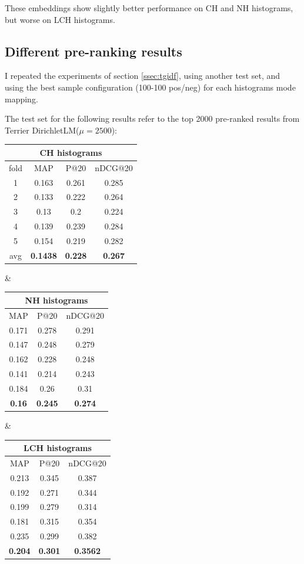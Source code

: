 These embeddings show slightly better performance on CH and NH histograms, but worse on LCH histograms.

\subsection{Different pre-ranking results}

I repeated the experiments of section \ref{ssec:tgidf}, using another test set, and using the best sample configuration (100-100 pos/neg) for each histograms mode mapping.

The test set for the following results refer to the top 2000 pre-ranked results from Terrier DirichletLM($\mu = 2500$):

\begin{adjustbox}{center, tabular=ccc, caption={DRMM runs, 100-100 pos/neg IDF weighting, stemmed with stopwords removal, run to re-rank generated with ``DiricheletLM'' algorithm}, nofloat=table}
\centering
\begin{tabular}{c|ccc}
\hline
\multicolumn{4}{c}{CH histograms} \\ \hline
fold & MAP & P@20 & nDCG@20 \\ \hline
1 & 0.163 & 0.261 & 0.285 \\
2 & 0.133 & 0.222 & 0.264 \\
3 & 0.13 & 0.2 & 0.224 \\
4 & 0.139 & 0.239 & 0.284 \\
5 & 0.154 & 0.219 & 0.282 \\ \hline
avg & \textbf{0.1438} & \textbf{0.228} & \textbf{0.267} \\
\hline
\end{tabular} &
\begin{tabular}{ccc}
\hline
\multicolumn{3}{c}{NH histograms} \\ \hline
MAP & P@20 & nDCG@20 \\ \hline
0.171 & 0.278 & 0.291 \\
0.147 & 0.248 & 0.279 \\
0.162 & 0.228 & 0.248 \\
0.141 & 0.214 & 0.243 \\
0.184 & 0.26 & 0.31 \\ \hline
\textbf{0.16} & \textbf{0.245} & \textbf{0.274} \\
\hline
\end{tabular} &
\begin{tabular}{ccc}
\hline
\multicolumn{3}{c}{LCH histograms} \\ \hline
MAP & P@20 & nDCG@20 \\ \hline
0.213 & 0.345 & 0.387 \\
0.192 & 0.271 & 0.344 \\
0.199 & 0.279 & 0.314 \\
0.181 & 0.315 & 0.354 \\
0.235 & 0.299 & 0.382 \\ \hline
\textbf{0.204} & \textbf{0.301} & \textbf{0.3562} \\
\hline
\end{tabular}
\end{adjustbox}

